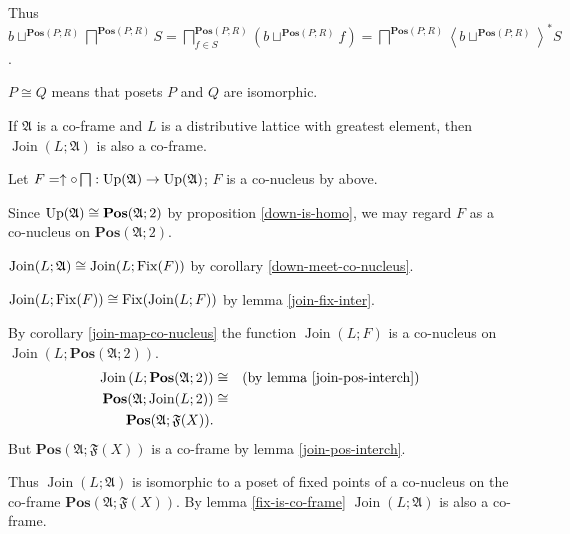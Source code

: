 Thus $b\sqcup^{\mathbf{Pos}(P;R)}\bigsqcap^{\mathbf{Pos}(P;R)}S=\bigsqcap_{f\in S}^{\mathbf{Pos}(P;R)}\left(b\sqcup^{\mathbf{Pos}(P;R)}f\right)=\bigsqcap^{\mathbf{Pos}(P;R)}\left\langle b\sqcup^{\mathbf{Pos}(P;R)}\right\rangle ^{\ast}S$.
\begin{defn}
$P\cong Q$ means that posets $P$ and $Q$ are isomorphic.\end{defn}
\begin{thm}
\label{frame-main}If $\mathfrak{A}$ is a co-frame and $L$ is a
distributive lattice with greatest element, then $\operatorname{Join}(L;\mathfrak{A})$
is also a co-frame.
\end{thm}
Let $F=\uparrow\circ\bigsqcap:\operatorname{Up}(\mathfrak{A})\rightarrow\operatorname{Up}(\mathfrak{A})$;
$F$ is a co-nucleus by above.

Since $\operatorname{Up}(\mathfrak{A})\cong\mathbf{Pos}(\mathfrak{A};2)$ by
proposition \ref{down-is-homo}, we may regard $F$ as a co-nucleus
on $\mathbf{Pos}(\mathfrak{A};2)$.

$\operatorname{Join}(L;\mathfrak{A})\cong\operatorname{Join}(L;\operatorname{Fix}(F))$
by corollary \ref{down-meet-co-nucleus}.

$\operatorname{Join}(L;\operatorname{Fix}(F))\cong\operatorname{Fix}(\operatorname{Join}(L;F))$
by lemma \ref{join-fix-inter}.

By corollary \ref{join-map-co-nucleus} the function $\operatorname{Join}(L;F)$
is a co-nucleus on $\operatorname{Join}\left(L;\mathbf{Pos}(\mathfrak{A};2)\right)$.
\begin{eqnarray*}
\operatorname{Join}\left(L;\mathbf{Pos}(\mathfrak{A};2)\right) & \cong & \text{(by lemma \ref{join-pos-interch})}\\
\mathbf{Pos}(\mathfrak{A};\operatorname{Join}(L;2)) & \cong\\
\mathbf{Pos}(\mathfrak{A};\mathfrak{F}(X)).
\end{eqnarray*}
But $\mathbf{Pos}(\mathfrak{A};\mathfrak{F}(X))$ is a co-frame by
lemma \ref{join-pos-interch}.

Thus $\operatorname{Join}(L;\mathfrak{A})$ is isomorphic to a poset
of fixed points of a co-nucleus on the co-frame $\mathbf{Pos}(\mathfrak{A};\mathfrak{F}(X))$.
By lemma \ref{fix-is-co-frame} $\operatorname{Join}(L;\mathfrak{A})$
is also a co-frame.
